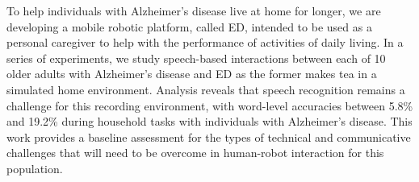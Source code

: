 To help individuals with Alzheimer's disease live at home for longer, we are developing a mobile robotic platform, called ED, intended to be used as a personal caregiver to help with the performance of activities of daily living. In a series of experiments, we study speech-based interactions between each of 10 older adults with Alzheimer's disease and ED as the former makes tea in a simulated home environment. Analysis reveals that speech recognition remains a challenge for this recording environment, with word-level accuracies between 5.8\% and 19.2\% during household tasks with individuals with Alzheimer's disease. This work provides a baseline assessment for the types of technical and communicative challenges that will need to be overcome in human-robot interaction for this population.
